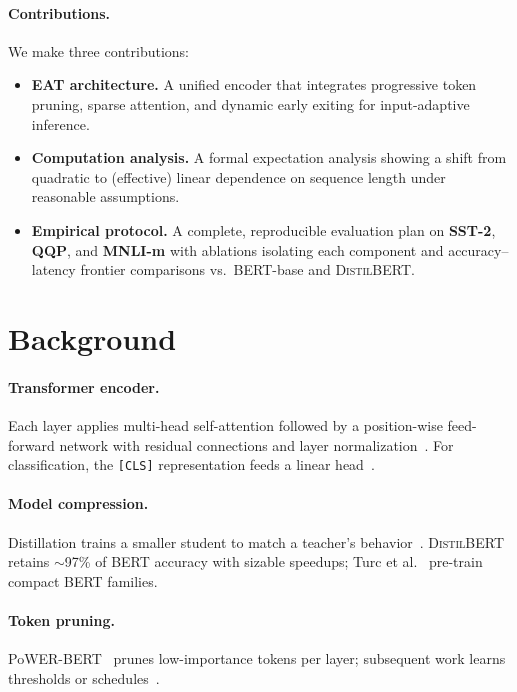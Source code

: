 \documentclass[11pt,letterpaper]{article}
\theoremstyle{plain}
\newcommand{\eat}{\textsc{EAT}}
\newcommand{\bert}{\textsc{BERT}}
\newcommand{\distilbert}{\textsc{DistilBERT}}
\newcommand{\cls}{\texttt{[CLS]}}
\begin{document}
\paragraph{Contributions.} We make three contributions:
\begin{itemize}
    \item \textbf{\eat{} architecture.} A unified encoder that integrates progressive token pruning, sparse attention, and dynamic early exiting for input-adaptive inference.
    \item \textbf{Computation analysis.} A formal expectation analysis showing a shift from quadratic to (effective) linear dependence on sequence length under reasonable assumptions.
    \item \textbf{Empirical protocol.} A complete, reproducible evaluation plan on \textbf{SST-2}, \textbf{QQP}, and \textbf{MNLI-m} with ablations isolating each component and accuracy–latency frontier comparisons vs.\ \bert{}-base and \distilbert{}.
\end{itemize}

\section{Background}
\paragraph{Transformer encoder.} Each layer applies multi-head self-attention followed by a position-wise feed-forward network with residual connections and layer normalization~\citep{vaswani2017attention}. For classification, the \cls{} representation feeds a linear head~\citep{devlin2019bert}.

\paragraph{Model compression.} Distillation trains a smaller student to match a teacher's behavior~\citep{hinton2015distill}. \distilbert{}~\citep{sanh2019distilbert} retains $\sim$97\% of \bert{} accuracy with sizable speedups; Turc et al.~\citep{turc2019wellread} pre-train compact \bert{} families.

\paragraph{Token pruning.} PoWER-\bert{}~\citep{goyal2020powerbert} prunes low-importance tokens per layer; subsequent work learns thresholds or schedules~\citep{kim2021learned}.
\end{document}
